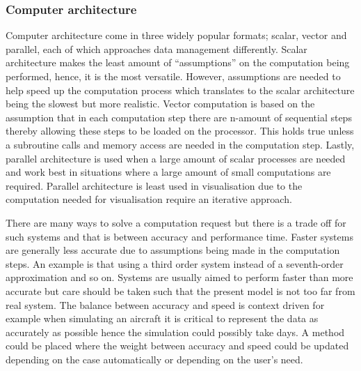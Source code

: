 \subsubsection{Computer architecture}

Computer architecture come in three widely popular formats; scalar, vector and parallel, each of which approaches data management differently. Scalar architecture makes the least amount of ``assumptions'' on the computation being performed, hence, it is the most versatile. However, assumptions are needed to help speed up the computation process which translates to the scalar architecture being the slowest but more realistic. Vector computation is based on the assumption that in each computation step there are n-amount of sequential steps thereby allowing these steps to be loaded on the processor. This holds true unless a subroutine calls and memory access are needed in the computation step. Lastly, parallel architecture is used when a large amount of scalar processes are needed and work best in situations where a large amount of small computations are required. Parallel architecture is least used in visualisation due to the computation needed for visualisation require an iterative approach.


There are many ways to solve a computation request but there is a trade off for such systems and that is between accuracy and performance time. Faster systems are generally less accurate due to assumptions being made in the computation steps. An example is that using a third order system instead of a seventh-order approximation and so on. Systems are usually aimed to perform faster than more accurate but care should be taken such that the present model is not too far from real system. The balance between accuracy and speed is context driven for example when simulating an aircraft it is critical to represent the data as accurately as possible hence the simulation could possibly take days. A method could be placed where the weight between accuracy and speed could be updated depending on the case automatically or depending on the user's need.

